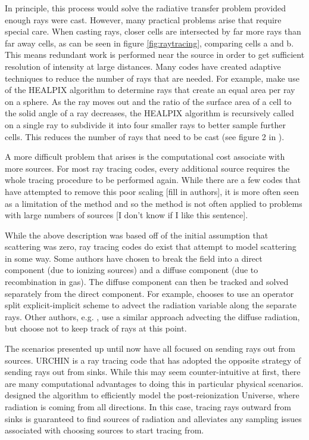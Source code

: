 In principle, this process would solve the radiative transfer problem provided enough rays were cast. However, many practical problems arise that require special care. When casting rays, closer cells are intersected by far more rays than far away cells, as can be seen in figure \ref{fig:raytracing}, comparing cells a and b. This means redundant work is performed near the source in order to get sufficient resolution of intensity at large distances. Many codes have created adaptive techniques to reduce the number of rays that are needed. For example, \citet{abelWandelt02} make use of the HEALPIX algorithm \citep{gorskiEt99} to determine rays that create an equal area per ray on a sphere. As the ray moves out and the ratio of the surface area of a cell to the solid angle of a ray decreases, the HEALPIX algorithm is recursively called on a single ray to subdivide it into four smaller rays to better sample further cells. This reduces the number of rays that need to be cast (see figure 2 in \citet{abelWandelt02}).

A more difficult problem that arises is the computational cost associate with more sources. For most ray tracing codes, every additional source requires the whole tracing procedure to be performed again. While there are a few codes that have attempted to remove this poor scaling [fill in authors], it is more often seen as a limitation of the method and so the method is not often applied to problems with large numbers of sources [I don't know if I like this sentence].

While the above description was based off of the initial assumption that scattering was zero, ray tracing codes do exist that attempt to model scattering in some way. Some authors have chosen to break the field into a direct component (due to ionizing sources) and a diffuse component (due to recombination in gas). The diffuse component can then be tracked and solved separately from the direct component. For example, \citet{razoumovScott99} chooses to use an operator split explicit-implicit scheme to advect the radiation variable along the separate rays. Other authors, e.g. \citet{abelNormanMadau99}, use a similar approach advecting the diffuse radiation, but choose not to keep track of rays at this point.

The scenarios presented up until now have all focused on sending rays out from sources. URCHIN \citep{altayTheuns13} is a ray tracing code that has adopted the opposite strategy of sending rays out from sinks. While this may seem counter-intuitive at first, there are many computational advantages to doing this in particular physical scenarios. \citet{altayTheuns13} designed the algorithm to efficiently model the post-reionization Universe, where radiation is coming from all directions. In this case, tracing rays outward from sinks is guaranteed to find sources of radiation and alleviates any sampling issues associated with choosing sources to start tracing from.

